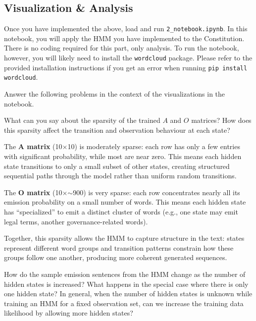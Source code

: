 \documentclass{article}
\begin{document}
\subsection{Visualization \& Analysis}

Once you have implemented the above, load and run \texttt{2_notebook.ipynb}. In this notebook, you will apply the HMM you have implemented to the Constitution. There is no coding required for this part, only analysis. To run the notebook, however, you will likely need to install the \texttt{wordcloud} package. Please refer to the provided installation instructions if you get an error when running \texttt{pip install wordcloud}.

Answer the following problems in the context of the visualizations in the notebook.

\indent\problem[3] %
What can you say about the sparsity of the trained $A$ and $O$ matrices? How does this sparsity affect the transition and observation behaviour at each state?
\begin{subsolution}

The \textbf{A matrix} (10$\times$10) is moderately sparse: each row has only a few entries with significant probability, while most are near zero. This means each hidden state transitions to only a small subset of other states, creating structured sequential paths through the model rather than uniform random transitions.

The \textbf{O matrix} (10$\times$$\sim$900) is very sparse: each row concentrates nearly all its emission probability on a small number of words. This means each hidden state has ``specialized'' to emit a distinct cluster of words (e.g., one state may emit legal terms, another governance-related words).

Together, this sparsity allows the HMM to capture structure in the text: states represent different word groups and transition patterns constrain how these groups follow one another, producing more coherent generated sequences.

\end{subsolution}
\newpage

\indent\problem[5] %
How do the sample emission sentences from the HMM change as the number of hidden states is increased? What happens in the special case where there is only one hidden state? In general, when the number of hidden states is unknown while training an HMM for a fixed observation set, can we increase the training data likelihood by allowing more hidden states?
\end{document}
